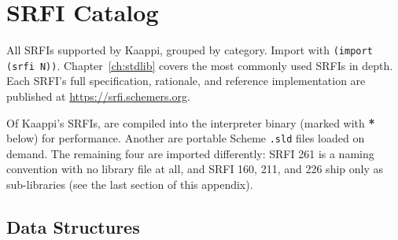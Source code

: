 \chapter{SRFI Catalog}
\label{app:srfi}

All \srfitotal{} SRFIs supported by Kaappi, grouped by category. Import with \texttt{(import (srfi N))}. Chapter~\ref{ch:stdlib} covers the most commonly used SRFIs in depth. Each SRFI's full specification, rationale, and reference implementation are published at \url{https://srfi.schemers.org}.

\begin{note}
Of Kaappi's \srfitotal{} SRFIs, \srfibuiltin{} are compiled into the interpreter binary (marked with \textbf{*} below) for performance. Another \srfiportable{} are portable Scheme \texttt{.sld} files loaded on demand. The remaining four are imported differently: SRFI 261 is a naming convention with no library file at all, and SRFI 160, 211, and 226 ship only as sub-libraries (see the last section of this appendix).
\end{note}

\section{Data Structures}

